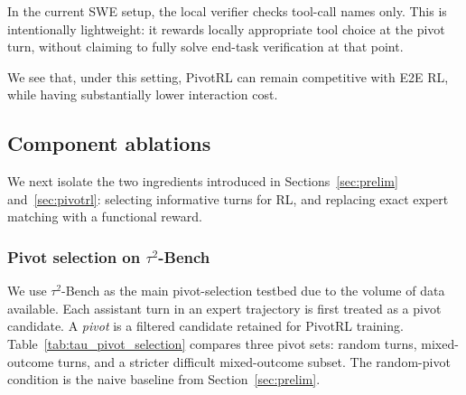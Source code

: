 In the current SWE setup, the local verifier checks tool-call names only. This is intentionally lightweight: it rewards locally appropriate tool choice at the pivot turn, without claiming to fully solve end-task verification at that point. 

We see that, under this setting, PivotRL can remain competitive with E2E RL, while having substantially lower interaction cost. 

\subsection{Component ablations}
\label{sec:component_ablations}

We next isolate the two ingredients introduced in Sections~\ref{sec:prelim} and~\ref{sec:pivotrl}: selecting informative turns for RL, and replacing exact expert matching with a functional reward.

\subsubsection{Pivot selection on $\tau^2$-Bench}
\label{sec:tau_pivot_ablation}

We use $\tau^2$-Bench as the main pivot-selection testbed due to the volume of data available. Each assistant turn in an expert trajectory is first treated as a pivot candidate. A \emph{pivot} is a filtered candidate retained for PivotRL training. Table~\ref{tab:tau_pivot_selection} compares three pivot sets: random turns, mixed-outcome turns, and a stricter difficult mixed-outcome subset. The random-pivot condition is the naive baseline from Section~\ref{sec:prelim}.

